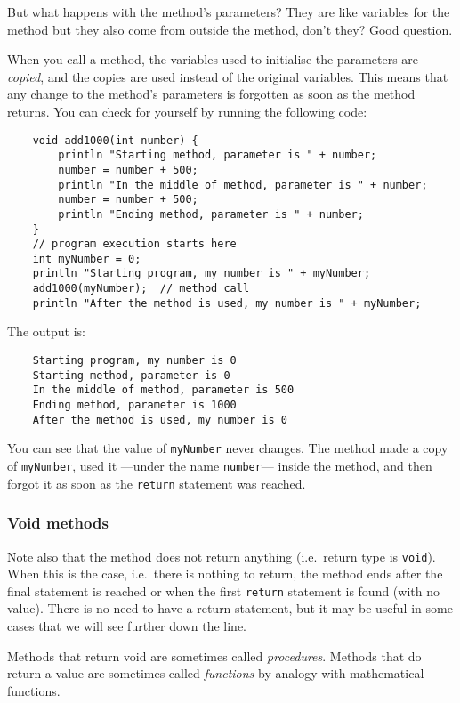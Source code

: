 But what happens with the method's parameters? They are like variables
for the method but they also come from outside the method, don't they?
Good question. 

When you call a method, the variables used to initialise the
parameters are \emph{copied}, and the copies are used instead of the
original variables. This means that any change to the method's
parameters is forgotten as soon as the method returns. You can check
for yourself by running the following code: 

\begin{verbatim}
    void add1000(int number) {
        println "Starting method, parameter is " + number;
        number = number + 500;
        println "In the middle of method, parameter is " + number;
        number = number + 500;
        println "Ending method, parameter is " + number;
    }
    // program execution starts here
    int myNumber = 0;
    println "Starting program, my number is " + myNumber;
    add1000(myNumber);  // method call
    println "After the method is used, my number is " + myNumber;
\end{verbatim}

The output is: 

\begin{verbatim}
    Starting program, my number is 0
    Starting method, parameter is 0
    In the middle of method, parameter is 500
    Ending method, parameter is 1000
    After the method is used, my number is 0
\end{verbatim}

You can see that the value of \verb+myNumber+ never changes. The
method made a copy of \verb+myNumber+, used it ---under the name
\verb+number+--- inside the method, and then forgot it as soon as the
\verb+return+ statement was reached. 

\subsubsection*{Void methods}
\label{void}

Note also that the method does not return anything (i.e.~return type
is \verb+void+). When this is the case, 
i.e.~there is nothing to return, the method
ends after the final statement is reached or when the first \verb+return+
statement is found (with no value). There is no need to have a return
statement, but it may be useful in some cases that we will see further
down the line. 

Methods that return void are sometimes called
\emph{procedures}. Methods that do return a value are sometimes called
\emph{functions} by analogy with mathematical functions.

